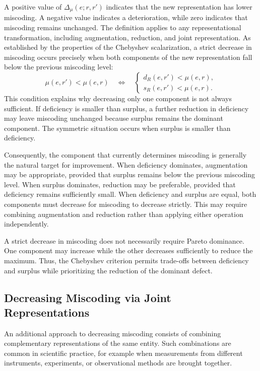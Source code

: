 A positive value of $\Delta_\mu(e;r,r')$ indicates that the new representation has lower miscoding. A negative value indicates a deterioration, while zero indicates that miscoding remains unchanged. The definition applies to any representational transformation, including augmentation, reduction, and joint representation. As established by the properties of the Chebyshev scalarization, a strict decrease in miscoding occurs precisely when both components of the new representation fall below the previous miscoding level:
\[
\mu(e,r') < \mu(e,r)
\quad\Longleftrightarrow\quad
\begin{cases}
d_R(e,r')<\mu(e,r),\\
s_R(e,r')<\mu(e,r).
\end{cases}
\]
This condition explains why decreasing only one component is not always sufficient. If deficiency is smaller than surplus, a further reduction in deficiency may leave miscoding unchanged because surplus remains the dominant component. The symmetric situation occurs when surplus is smaller than deficiency.

Consequently, the component that currently determines miscoding is generally the natural target for improvement. When deficiency dominates, augmentation may be appropriate, provided that surplus remains below the previous miscoding level. When surplus dominates, reduction may be preferable, provided that deficiency remains sufficiently small. When deficiency and surplus are equal, both components must decrease for miscoding to decrease strictly. This may require combining augmentation and reduction rather than applying either operation independently.

A strict decrease in miscoding does not necessarily require Pareto dominance. One component may increase while the other decreases sufficiently to reduce the maximum. Thus, the Chebyshev criterion permits trade-offs between deficiency and surplus while prioritizing the reduction of the dominant defect.


\subsection*{Decreasing Miscoding via Joint Representations}

An additional approach to decreasing miscoding consists of combining complementary representations of the same entity. Such combinations are common in scientific practice, for example when measurements from different instruments, experiments, or observational methods are brought together.

